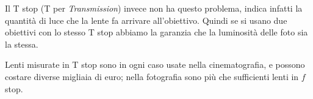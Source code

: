 Il T stop (T per \textit{Transmission}) invece non ha questo problema, indica infatti la quantità di luce che la lente fa arrivare all'obiettivo.
Quindi se si usano due obiettivi con lo stesso T stop abbiamo la garanzia che la luminosità delle foto sia la stessa.

Lenti misurate in T stop sono in ogni caso usate nella cinematografia, e possono costare diverse migliaia di euro; nella fotografia sono più che sufficienti lenti in $f$ stop.